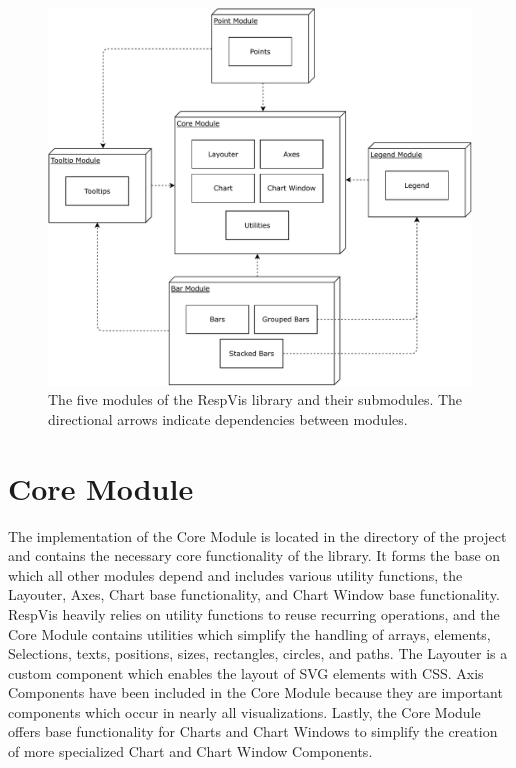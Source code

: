 \begin{figure}[tp]
\centering
\includegraphics[keepaspectratio,width=\linewidth,height=\fullh]
{diagrams/respvis-modules.pdf}
\caption[Modules of RespVis]{
The five modules of the RespVis library and their submodules. The
directional arrows indicate dependencies between modules.
}
\label{fig:Modules}
\end{figure}







\section{Core Module}

The implementation of the Core Module is located in the
 directory of the project and contains the
necessary core functionality of the library. It forms the base on
which all other modules depend and includes various utility functions,
the Layouter, Axes, Chart base functionality, and Chart Window base
functionality.  RespVis heavily relies on utility functions to reuse
recurring operations, and the Core Module contains utilities which
simplify the handling of arrays, elements, Selections, texts,
positions, sizes, rectangles, circles, and paths. The Layouter is a
custom component which enables the layout of SVG elements with CSS.
Axis Components have been included in the Core Module because they are
important components which occur in nearly all visualizations.  Lastly,
the Core Module offers base functionality for Charts and Chart
Windows to simplify the creation of more specialized Chart and Chart
Window Components.


